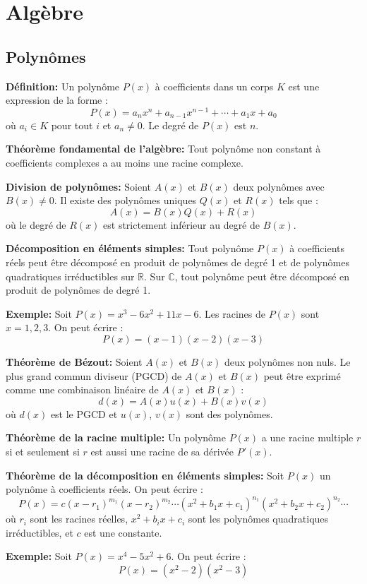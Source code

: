 \section{Algèbre}
\subsection{Polynômes}
\textbf{Définition:}
Un polynôme $P(x)$ à coefficients dans un corps $K$ est une expression de la forme :
\[
P(x) = a_n x^n + a_{n-1} x^{n-1} + \cdots + a_1 x + a_0
\]
où $a_i \in K$ pour tout $i$ et $a_n \neq 0$. Le degré de $P(x)$ est $n$.

\textbf{Théorème fondamental de l'algèbre:}
Tout polynôme non constant à coefficients complexes a au moins une racine complexe.

\textbf{Division de polynômes:}
Soient $A(x)$ et $B(x)$ deux polynômes avec $B(x) \neq 0$. Il existe des polynômes uniques $Q(x)$ et $R(x)$ tels que :
\[
A(x) = B(x) Q(x) + R(x)
\]
où le degré de $R(x)$ est strictement inférieur au degré de $B(x)$.

\textbf{Décomposition en éléments simples:}
Tout polynôme $P(x)$ à coefficients réels peut être décomposé en produit de polynômes de degré 1 et de polynômes quadratiques irréductibles sur $\mathbb{R}$. Sur $\mathbb{C}$, tout polynôme peut être décomposé en produit de polynômes de degré 1.

\textbf{Exemple:}
Soit $P(x) = x^3 - 6x^2 + 11x - 6$. Les racines de $P(x)$ sont $x = 1, 2, 3$. On peut écrire :
\[
P(x) = (x - 1)(x - 2)(x - 3)
\]

\textbf{Théorème de Bézout:}
Soient $A(x)$ et $B(x)$ deux polynômes non nuls. Le plus grand commun diviseur (PGCD) de $A(x)$ et $B(x)$ peut être exprimé comme une combinaison linéaire de $A(x)$ et $B(x)$ :
\[
d(x) = A(x) u(x) + B(x) v(x)
\]
où $d(x)$ est le PGCD et $u(x)$, $v(x)$ sont des polynômes.

\textbf{Théorème de la racine multiple:}
Un polynôme $P(x)$ a une racine multiple $r$ si et seulement si $r$ est aussi une racine de sa dérivée $P'(x)$.

\textbf{Théorème de la décomposition en éléments simples:}
Soit $P(x)$ un polynôme à coefficients réels. On peut écrire :
\[
P(x) = c (x - r_1)^{m_1} (x - r_2)^{m_2} \cdots (x^2 + b_1 x + c_1)^{n_1} (x^2 + b_2 x + c_2)^{n_2} \cdots
\]
où $r_i$ sont les racines réelles, $x^2 + b_i x + c_i$ sont les polynômes quadratiques irréductibles, et $c$ est une constante.

\textbf{Exemple:}
Soit $P(x) = x^4 - 5x^2 + 6$. On peut écrire :
\[
P(x) = (x^2 - 2)(x^2 - 3)
\]

